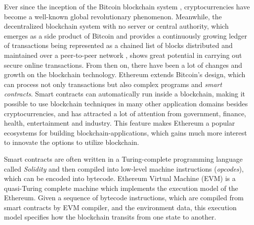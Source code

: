 \documentclass[runningheads]{llncs}
\begin{document}
Ever since the inception of the Bitcoin blockchain system \cite{nakamoto2008bitcoin}, cryptocurrencies have become a well-known global revolutionary phenomenon. Meanwhile, the decentralized blockchain system with no server or central authority, which emerges as a side product of Bitcoin and provides a continuously growing ledger of transactions being represented as a chained list of blocks distributed and maintained over a peer-to-peer network \cite{ZXDCW18}, shows great potential in carrying out secure online transactions. From then on, there have been a lot of changes and growth on the blockchain technology. %
Ethereum \cite{Ethereum} extends Bitcoin's design, which can process not only transactions but also complex programs and {\em smart contracts}. Smart contracts can automatically run inside a blockchain, 
making it possible to use blockchain techniques in many other application domains besides cryptocurrencies, and has attracted a lot of attention from government, finance, health, entertainment and industry. This feature makes Ethereum a popular ecosystems for building blockchain-applications, which gains much more interest to innovate the options to utilize blockchain. 

Smart contracts are often written in a Turing-complete programming language called \textit{Solidity} \cite{solidity} and then compiled into low-level machine instructions (\textit{opcodes}), which can be encoded into bytecode. Ethereum Virtual Machine (EVM) is a quasi-Turing complete machine which implements the execution model of the Ethereum. Given a sequence of bytecode instructions, which are compiled from smart contracts by EVM compiler, and the environment data, this execution model specifies how the blockchain transits from one state to another. 
\end{document}
